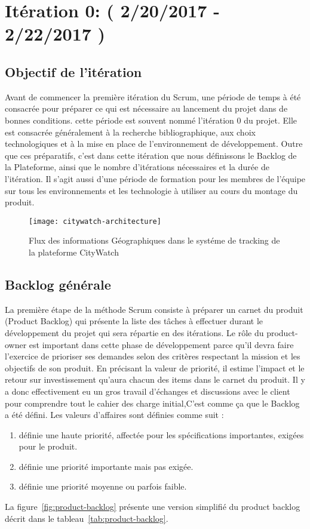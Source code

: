 \section{Itération 0: ( 2/20/2017 - 2/22/2017 )}



\subsection{Objectif de l'itération }
Avant de commencer la première itération du Scrum, une période de temps à été
consacrée pour préparer ce qui est nécessaire au lancement du projet dans de bonnes
conditions. cette période est souvent nommé l’itération 0 du projet. Elle est consacrée
généralement à la recherche bibliographique, aux choix technologiques et à la mise en
place de l’environnement de développement. Outre que ces préparatifs, c’est dans cette
itération que nous définissons le Backlog de la Plateforme, ainsi que le nombre
d’itérations nécessaires et la durée de l’itération. Il s’agit aussi d’une période de
formation pour les membres de l’équipe sur tous les environnements et les technologie à
utiliser au cours du montage du produit.

\begin{figure}[htbp]
  \centering
  \texttt{[image: citywatch-architecture]}
  \caption[Flux des information Géographiques en CityWatch]
  {Flux des informations Géographiques dans le systéme de tracking de la plateforme CityWatch}
  \label{fig:citywatch-architecture}
\end{figure}
\subsection{Backlog générale}

La première étape de la méthode Scrum consiste à préparer un carnet du produit
(Product Backlog) qui présente la liste des tâches à effectuer durant le développement
du projet qui sera répartie en des itérations. Le rôle du product-owner est important
dans cette phase de développement parce qu’il devra faire l’exercice de prioriser ses
demandes selon des critères respectant la mission et les objectifs de son produit. En
précisant la valeur de priorité, il estime l’impact et le retour sur investissement 
qu’aura chacun des items dans le carnet du produit.
Il y a donc effectivement eu un gros travail
d’échanges et discussions avec le client pour comprendre tout le cahier des charge
initial,C’est comme ça que le Backlog a été défini.
Les valeurs d’affaires sont définies comme suit :
\begin{enumerate}
\item définie une haute priorité, affectée pour les spécifications importantes,
exigées pour le produit.
\item définie une priorité importante mais pas exigée.
\item  définie une priorité moyenne ou parfois faible.
\end{enumerate}
La figure~\ref{fig:product-backlog} présente une version simplifié du product
backlog décrit dans le tableau~\ref{tab:product-backlog}.



